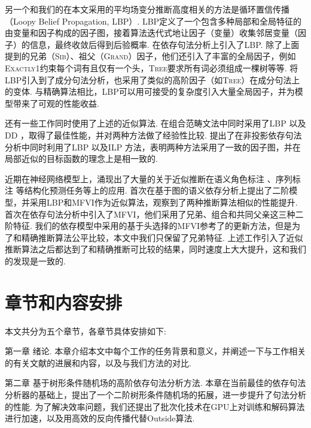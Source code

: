 另一个和我们的在本文采用的平均场变分推断高度相关的方法是循环置信传播（Loopy Belief Propagation, LBP）.
LBP定义了一个包含多种局部和全局特征的由变量和因子构成的因子图，接着算法迭代式地让因子（变量）收集邻居变量（因子）的信息，最终收敛后得到后验概率.
\citet{smith-eisner-2008-dependency,gormley-etal-2015-approximation}在依存句法分析上引入了LBP.
除了上面提到的兄弟（\textsc{Sib}）、祖父（\textsc{Grand}）因子，他们还引入了丰富的全局因子，例如\textsc{Exactly1}约束每个词有且仅有一个头，\textsc{Tree}要求所有词必须组成一棵树等等.
\citet{naradowsky-etal-2012-grammarless}将LBP引入到了成分句法分析，也采用了类似的高阶因子（如\textsc{Tree}）在成分句法上的变体.
与精确算法相比，LBP可以用可接受的复杂度引入大量全局因子，并为模型带来了可观的性能收益.

还有一些工作同时使用了上述的近似算法.
\citet{auli-lopez-2011-comparison}在组合范畴文法中同时采用了LBP \citep{smith-eisner-2008-dependency}以及DD \citep{koo-etal-2010-dual}，取得了最佳性能，并对两种方法做了经验性比较.
\citet{martins-etal-2010-turbo}提出了在非投影依存句法分析中同时利用了LBP \citep{smith-eisner-2008-dependency}以及ILP \citep{martins-etal-2009-concise}方法，表明两种方法采用了一致的因子图，并在局部近似的目标函数的理念上是相一致的.

近期在神经网络模型上，涌现出了大量的关于近似推断在语义角色标注 \citep{li-etal-2020-high}、序列标注 \citep{wang-etal-2020-ain}等结构化预测任务等上的应用.
\citet{wang-etal-2019-second}首次在基于图的语义依存分析上提出了二阶模型，并采用LBP和MFVI作为近似算法，观察到了两种推断算法相似的性能提升.
\citet{wang-tu-2020-second}首次在依存句法分析中引入了MFVI，他们采用了兄弟、组合和共同父亲这三种二阶特征.
我们的依存模型中采用的基于头选择的MFVI参考了\citet{wang-tu-2020-second}的更新方法，但是为了和精确推断算法公平比较，本文中我们只保留了兄弟特征.
上述工作引入了近似推断算法之后都达到了和精确推断可比较的结果，同时速度上大大提升，这和我们的发现是一致的.

\section{章节和内容安排}

本文共分为五个章节，各章节具体安排如下:

第一章 绪论.
本章介绍本文中每个工作的任务背景和意义，并阐述一下与工作相关的有关文献的进展和内容，以及与我们方法的对比.

第二章 基于树形条件随机场的高阶依存句法分析方法.
本章在当前最佳的依存句法分析器的基础上，提出了一个二阶树形条件随机场的拓展，进一步提升了句法分析的性能.
为了解决效率问题，我们还提出了批次化技术在GPU上对训练和解码算法进行加速，以及用高效的反向传播代替Outside算法.

